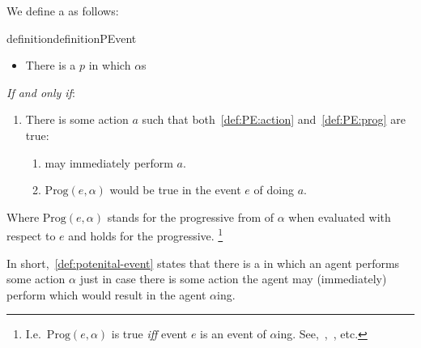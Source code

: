 \begin{note}
  We define a \pevent{} as follows:
  \begin{restatable}[\pevent{3}]{definition}{definitionPEvent}
    \label{def:potenital-event}

    \begin{itemize}
    \item
      There is a \pevent{} \(p\) in which \vAgent{} \(\alpha\)s
    \end{itemize}

    \emph{If and only if}:

    \begin{enumerate}[label=]
    \item
      There is some action \(a\) such that both~\ref{def:PE:action} and~\ref{def:PE:prog} are true:
      \begin{enumerate}[label=\alph*., ref=(\alph*)]
      \item
        \label{def:PE:action}
        \vAgent{} may immediately perform \(a\).
      \item
        \label{def:PE:prog}
        \(\text{Prog}(e, \alpha)\) would be true in the event \(e\) of \vAgent{} doing \(a\).
      \end{enumerate}
    \end{enumerate}
    Where \(\text{Prog}(e, \alpha)\) stands for the progressive from of \(\alpha\) when evaluated with respect to \(e\) and \assuPP{} holds for the progressive.%
    \footnote{
      I.e.\ \(\text{Prog}(e, \alpha)\) is true \emph{iff} event \(e\) is an event of \(\alpha\)ing.
      See,~\textcite{Richards:1981wo},~\textcite{Portner:2011vi}, etc.
    }
  \end{restatable}

  In short,~\autoref{def:potenital-event} states that there is a \pevent{} in which an agent performs some action \(\alpha\) just in case there is some action the agent may (immediately) perform which would result in the agent \(\alpha\)ing.
\end{note}

